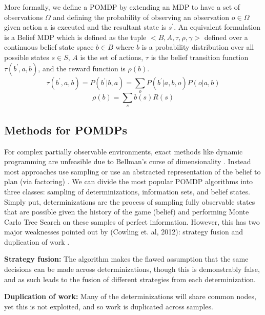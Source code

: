 \documentclass[msc, deptreport, ai, romanprepages]{infthesis}
\begin{document}
More formally, we define a POMDP by extending an MDP to have a set of observations \(\Omega\) and defining the probability of observing an observation \(o \in \Omega\) given action a is executed and the resultant state is \(s^\prime\). An equivalent formulation is a Belief MDP which is defined as the tuple \(<B,A,\tau,\rho,\gamma>\) defined over a continuous belief state space \(b\in B\) where \(b\) is a probability distribution over all possible states \(s\in S\), \(A\) is the set of actions, \(\tau\) is the belief transition function \(\tau(b^\prime,a,b)\), and the reward function is \(\rho (b)\).
\begin{equation}
\tau(b^\prime,a,b) = P(b^\prime|b,a) = \sum_o P(b^\prime|a,b,o)P(o|a,b)
\end{equation}
\begin{equation}
\rho(b) = \sum_s b(s)R(s)
\end{equation}

\subsection{Methods for POMDPs}
For complex partially observable environments, exact methods like dynamic programming are unfeasible due to Bellman’s curse of dimensionality \cite{Mihai}. Instead most approaches use sampling or use an abstracted representation of the belief to plan (via factoring) \cite{Silver-veness} \cite{Kaebling-Lozano}. 
We can divide the most popular POMDP algorithms into three classes: sampling of determinizations, information sets, and belief states. Simply put, determinizations are the process of sampling fully observable states that are possible given the history of the game (belief) and performing Monte Carlo Tree Search on these samples of perfect information. However, this has two major weaknesses pointed out by (Cowling et. al, 2012): strategy fusion and duplication of work \cite{Cowling}. 
\begin{description}

\item \textbf{Strategy fusion:} The algorithm makes the flawed assumption that the same decisions can be made across determinizations, though this is demonstrably false, and as such leads to the fusion of different strategies from each determinization.
\item \textbf{Duplication of work:} Many of the determinizations will share common nodes, yet this is not exploited, and so work is duplicated across samples.

\end{description}
\end{document}

